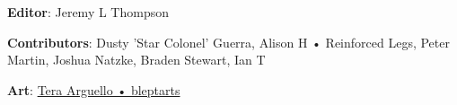 \begin{description}

\item {\bfseries Editor}: Jeremy L Thompson

\item {\bfseries Contributors}: Dusty 'Star Colonel' Guerra, Alison H • Reinforced Legs, Peter Martin, Joshua Natzke, Braden Stewart, Ian T

\item {\bfseries Art}: \href{https://ko-fi.com/bleptarts}{Tera Arguello • bleptarts}

\end{description}
